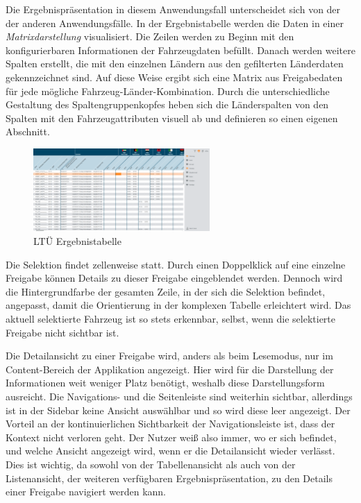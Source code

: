 Die Ergebnispräsentation in diesem Anwendungsfall unterscheidet sich von der der anderen Anwendungsfälle. In der Ergebnistabelle werden die Daten in einer \textit{Matrixdarstellung} visualisiert. Die Zeilen werden zu Beginn mit den konfigurierbaren Informationen der Fahrzeugdaten befüllt. Danach werden weitere Spalten erstellt, die mit den einzelnen Ländern aus den gefilterten Länderdaten gekennzeichnet sind. Auf diese Weise ergibt sich eine Matrix aus Freigabedaten für jede mögliche Fahrzeug-Länder-Kombination. Durch die unterschiedliche Gestaltung des Spaltengruppenkopfes heben sich die Länderspalten von den Spalten mit den Fahrzeugattributen visuell ab und definieren so einen eigenen Abschnitt.
\begin{figure}[H]
 \centering
 \includegraphics[width=0.6\textwidth]{grafiken/ltue_table.png}
 \caption{LTÜ Ergebnistabelle}
 \label{fig:ltueTable}
\end{figure}
Die Selektion findet zellenweise statt. Durch einen Doppelklick auf eine einzelne Freigabe können Details zu dieser Freigabe eingeblendet werden. Dennoch wird die Hintergrundfarbe der gesamten Zeile, in der sich die Selektion befindet, angepasst, damit die Orientierung in der komplexen Tabelle erleichtert wird. Das aktuell selektierte Fahrzeug ist so stets erkennbar, selbst, wenn die selektierte Freigabe nicht sichtbar ist.\par
Die Detailansicht zu einer Freigabe wird, anders als beim Lesemodus, nur im Content-Bereich der Applikation angezeigt. Hier wird für die Darstellung der Informationen weit weniger Platz benötigt, weshalb diese Darstellungsform ausreicht. Die Navigations- und die Seitenleiste sind weiterhin sichtbar, allerdings ist in der Sidebar keine Ansicht auswählbar und so wird diese leer angezeigt. Der Vorteil an der kontinuierlichen Sichtbarkeit der Navigationsleiste ist, dass der Kontext nicht verloren geht. Der Nutzer weiß also immer, wo er sich befindet, und welche Ansicht angezeigt wird, wenn er die Detailansicht wieder verlässt. Dies ist wichtig, da sowohl von der Tabellenansicht als auch von der Listenansicht, der weiteren verfügbaren Ergebnispräsentation, zu den Details einer Freigabe navigiert werden kann.\par

